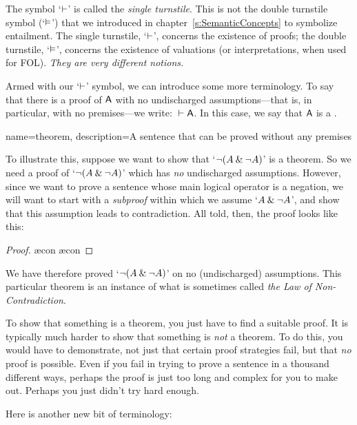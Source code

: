 The symbol `$\vdash$' is called the \emph{single turnstile}. This is not the {double turnstile} symbol (`$\vDash$') that we introduced in chapter~\ref{s:SemanticConcepts} to symbolize entailment. The single turnstile, `$\vdash$', concerns the existence of proofs; the double turnstile, `$\vDash$', concerns the existence of valuations (or interpretations, when used for FOL). \emph{They are very different notions.}

Armed with our `$\vdash$' symbol, we can introduce some more terminology. To say that there is a proof of $\mathsf{A}$ with no undischarged assumptions---that is, in particular, with no premises---we write: ${} \vdash \mathsf{A}$. In this case, we say that $\mathsf{A}$ is a .

{
name=theorem,
description={A sentence that can be proved without any premises}
}

        To illustrate this, suppose we want to show that `${\neg} (A \mathbin{\&} {\neg} A)$' is a theorem.  So we need a proof of `${\neg}(A \mathbin{\&} {\neg} A)$' which has \emph{no} undischarged assumptions. However, since we want to prove a sentence whose main logical operator is a negation, we will want to start with a \emph{subproof} within which we assume `$A \mathbin{\&} {\neg} A$', and show that this assumption leads to contradiction. All told, then, the proof looks like this:
	\begin{proof}
		\open
			\ae{con}
			\ae{con}
		\close
	\end{proof}
We have therefore proved `${\neg} (A \mathbin{\&} {\neg} A)$' on no (undischarged) assumptions. This particular theorem is an instance of what is sometimes called \emph{the Law of Non-Contradiction}.

To show that something is a theorem, you just have to find a suitable proof. It is typically much harder to show that something is \emph{not} a theorem. To do this, you would have to demonstrate, not just that certain proof strategies fail, but that \emph{no} proof is possible. Even if you fail in trying to prove a sentence in a thousand different ways, perhaps the proof is just too long and complex for you to make out. Perhaps you just didn't try hard enough.

Here is another new bit of terminology:
        
